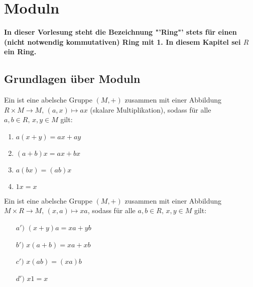 \newpage
\section{Moduln}
\begin{center}
	\textbf{In dieser Vorlesung steht die Bezeichnung "'Ring"' stets für einen (nicht notwendig kommutativen) Ring mit 1. In diesem Kapitel sei $R$ ein Ring.}
\end{center}
\subsection{Grundlagen über Moduln}
\begin{df}\label{df1.1}
	Ein  ist eine abelsche Gruppe $(M, +)$ zusammen mit einer Abbildung $R\times M \to M, \, (a,x) \mapsto ax$ (skalare Multiplikation), sodass für alle $a,b\in R, \, x,y\in M$ gilt:
	\begin{enumerate}[label= \alph*)]
		\item $a(x+y) = ax + ay$
		\item $(a+b)x = ax+bx$
		\item $a(bx) = (ab)x$
		\item $1x = x$
	\end{enumerate}
Ein  ist eine abelsche Gruppe $(M, +)$ zusammen mit einer Abbildung $M\times R \to M, \, (x,a) \mapsto xa$, sodass für alle $a,b\in R, \, x,y\in M$ gilt:
\begin{enumerate}
	\item[$a')$] $(x+y)a = xa+ yb$
	\item[$b')$] $x(a+b) = xa + xb$
	\item[$c')$] $x(ab) = (xa)b$
	\item[$d')$] $x1=x$
\end{enumerate}
\end{df}
